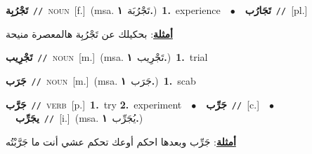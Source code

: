 \documentclass[10pt,a4paper,twoside]{article} %
\begin{document}
\begin{multicols}{2}
{\setlength\topsep{0pt}\textbf{\foreignlanguage{arabic}{تَجْرُبِة}}\ {\color{gray}\texttt{//}\color{black}}\ \textsc{noun}\ [f.]\ \color{gray}(msa. \foreignlanguage{arabic}{تَجْرُبَة}~\foreignlanguage{arabic}{\textbf{١.}})\color{black}\ \textbf{1.}~experience\ \ $\bullet$\ \ \setlength\topsep{0pt}\textbf{\foreignlanguage{arabic}{تَجَارُب}}\ {\color{gray}\texttt{//}\color{black}}\ [pl.]\  \begin{flushright}\color{gray}\foreignlanguage{arabic}{\textbf{\underline{\foreignlanguage{arabic}{أمثلة}}}: بحكيلك عن تَجْرُبِة هالمعصرة منيحة}\end{flushright}\color{black}} \vspace{2mm}

{\setlength\topsep{0pt}\textbf{\foreignlanguage{arabic}{تَجْرِيب}}\ {\color{gray}\texttt{//}\color{black}}\ \textsc{noun}\ [m.]\ \color{gray}(msa. \foreignlanguage{arabic}{تَجْرِيب}~\foreignlanguage{arabic}{\textbf{١.}})\color{black}\ \textbf{1.}~trial\ } \vspace{2mm}

{\setlength\topsep{0pt}\textbf{\foreignlanguage{arabic}{جَرَب}}\ {\color{gray}\texttt{//}\color{black}}\ \textsc{noun}\ [m.]\ \color{gray}(msa. \foreignlanguage{arabic}{جَرَب}~\foreignlanguage{arabic}{\textbf{١.}})\color{black}\ \textbf{1.}~scab\ } \vspace{2mm}

{\setlength\topsep{0pt}\textbf{\foreignlanguage{arabic}{جَرَّب}}\ {\color{gray}\texttt{//}\color{black}}\ \textsc{verb}\ [p.]\ \textbf{1.}~try  \textbf{2.}~experiment\ \ $\bullet$\ \ \setlength\topsep{0pt}\textbf{\foreignlanguage{arabic}{جَرِّب}}\ {\color{gray}\texttt{//}\color{black}}\ [c.]\ \ $\bullet$\ \ \setlength\topsep{0pt}\textbf{\foreignlanguage{arabic}{يجَرِّب}}\ {\color{gray}\texttt{//}\color{black}}\ [i.]\ \color{gray}(msa. \foreignlanguage{arabic}{يُجَرِّب}~\foreignlanguage{arabic}{\textbf{١.}})\color{black}\  \begin{flushright}\color{gray}\foreignlanguage{arabic}{\textbf{\underline{\foreignlanguage{arabic}{أمثلة}}}: جَرِّب وبعدها احكم أوعك تحكم عشي أنت ما جَرَّبْتُه}\end{flushright}\color{black}} \vspace{2mm}


\end{multicols}
\end{document}
